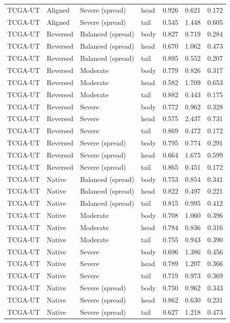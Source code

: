 \begin{longtable}{lllllll}
TCGA-UT & Aligned & Severe (spread) & head & 0.926 & 0.621 & 0.172 \\
TCGA-UT & Aligned & Severe (spread) & tail & 0.545 & 1.448 & 0.605 \\
TCGA-UT & Reversed & Balanced (spread) & body & 0.827 & 0.719 & 0.284 \\
TCGA-UT & Reversed & Balanced (spread) & head & 0.670 & 1.062 & 0.473 \\
TCGA-UT & Reversed & Balanced (spread) & tail & 0.895 & 0.552 & 0.207 \\
TCGA-UT & Reversed & Moderate & body & 0.779 & 0.826 & 0.317 \\
TCGA-UT & Reversed & Moderate & head & 0.582 & 1.709 & 0.653 \\
TCGA-UT & Reversed & Moderate & tail & 0.882 & 0.443 & 0.175 \\
TCGA-UT & Reversed & Severe & body & 0.772 & 0.962 & 0.328 \\
TCGA-UT & Reversed & Severe & head & 0.575 & 2.437 & 0.731 \\
TCGA-UT & Reversed & Severe & tail & 0.869 & 0.472 & 0.172 \\
TCGA-UT & Reversed & Severe (spread) & body & 0.795 & 0.774 & 0.291 \\
TCGA-UT & Reversed & Severe (spread) & head & 0.664 & 1.675 & 0.599 \\
TCGA-UT & Reversed & Severe (spread) & tail & 0.865 & 0.451 & 0.172 \\
TCGA-UT & Native & Balanced (spread) & body & 0.753 & 0.854 & 0.341 \\
TCGA-UT & Native & Balanced (spread) & head & 0.822 & 0.497 & 0.221 \\
TCGA-UT & Native & Balanced (spread) & tail & 0.815 & 0.995 & 0.412 \\
TCGA-UT & Native & Moderate & body & 0.708 & 1.060 & 0.396 \\
TCGA-UT & Native & Moderate & head & 0.784 & 0.836 & 0.316 \\
TCGA-UT & Native & Moderate & tail & 0.755 & 0.943 & 0.390 \\
TCGA-UT & Native & Severe & body & 0.696 & 1.386 & 0.456 \\
TCGA-UT & Native & Severe & head & 0.789 & 1.207 & 0.366 \\
TCGA-UT & Native & Severe & tail & 0.719 & 0.973 & 0.369 \\
TCGA-UT & Native & Severe (spread) & body & 0.750 & 0.962 & 0.343 \\
TCGA-UT & Native & Severe (spread) & head & 0.862 & 0.630 & 0.231 \\
TCGA-UT & Native & Severe (spread) & tail & 0.627 & 1.218 & 0.473 \\
\end{longtable}
